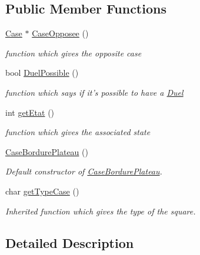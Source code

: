 \subsection*{Public Member Functions}
\begin{DoxyCompactItemize}
\item 
\hyperlink{class_case}{Case} $\ast$ \hyperlink{class_case_bordure_plateau_a52900f929180541474c7257ceaf9a3fb}{CaseOpposee} ()
\begin{DoxyCompactList}\small\item\em function which gives the opposite case \item\end{DoxyCompactList}\item 
bool \hyperlink{class_case_bordure_plateau_a4ed1b30a5b70bb5f245eae1c9638f47b}{DuelPossible} ()
\begin{DoxyCompactList}\small\item\em function which says if it's possible to have a \hyperlink{class_duel}{Duel} \item\end{DoxyCompactList}\item 
int \hyperlink{class_case_bordure_plateau_a2fdf2343b0374953a354ac30bb2209d8}{getEtat} ()
\begin{DoxyCompactList}\small\item\em function which gives the associated state \item\end{DoxyCompactList}\item 
\hyperlink{class_case_bordure_plateau_a43866711b53c73169d31843ffaf634d3}{CaseBordurePlateau} ()
\begin{DoxyCompactList}\small\item\em Default constructor of \hyperlink{class_case_bordure_plateau}{CaseBordurePlateau}. \item\end{DoxyCompactList}\item 
char \hyperlink{class_case_bordure_plateau_aed51310b5ed4acda3eb3aefe30366f31}{getTypeCase} ()
\begin{DoxyCompactList}\small\item\em Inherited function which gives the type of the square. \item\end{DoxyCompactList}\end{DoxyCompactItemize}


\subsection{Detailed Description}


